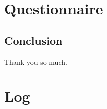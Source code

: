 \documentclass[letterpaper, 11pt]{article}
\title{\deliv{\srs}{Interview}}
\date{\datesrs}
\begin{document}
\maketitle
\tableofcontents
\thispagestyle{fancy}

\begin{flushleft}


\section{Questionnaire}







\subsection{Conclusion}
Thank you so much.


\section{Log}





\end{flushleft}
\end{document}
